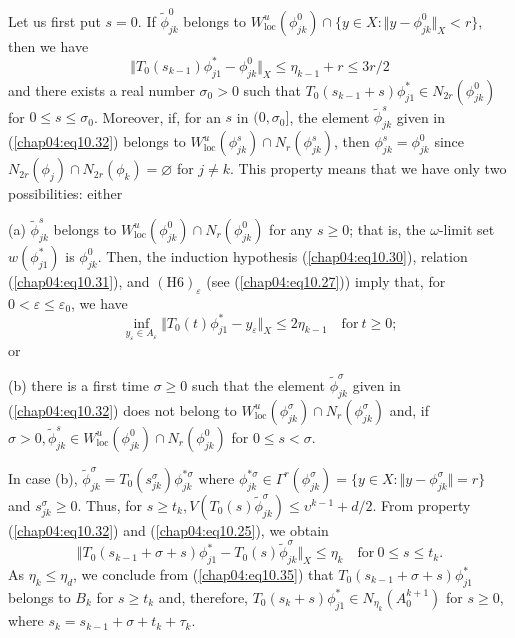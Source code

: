 \documentclass{surv-l}
\theoremstyle{plain}
\theoremstyle{definition}
\numberwithin{equation}{section}
\numberwithin{figure}{chapter}
\begin{document}
Let us first put $s=0$. If $\tilde{\phi}_{jk}^{0}$ belongs to $W_{\mathrm{loc}}^{u}(\phi_{jk}^{0})\cap\{y\in X:\Vert y-\phi_{jk}^{0}\Vert_{X}<r\}$, then we have
\begin{equation}\label{chap04:eq10.33}
\Vert T_{0}(s_{k-1})\phi_{j1}^{\ast}-\phi_{jk}^{0}\Vert_{X}\leq\eta_{k-1}+r\leq 3r/2
\end{equation}
and there exists a real number $\sigma_{0}>0$ such that $T_{0}(s_{k-1}+s)\phi_{j1}^{\ast}\in N_{2r}(\phi_{jk}^{0})$ for $0\leq s\leq\sigma_{0}$. Moreover, if, for an $s$ in $(0,\sigma_{0}]$, the element $\tilde{\phi}_{jk}^{s}$ given in (\ref{chap04:eq10.32}) belongs to $W_{\mathrm{loc}}^{u}(\phi_{jk}^{s})\cap N_{r}(\phi_{jk}^{s})$, then $\phi_{jk}^{s}=\phi_{jk}^{0}$ since $N_{2r}(\phi_{j})\cap N_{2r}(\phi_{k})={\varnothing}$ for $j\neq k$. This property means that we have only two possibilities: either

(a) $\tilde{\phi}_{jk}^{s}$ belongs to $W_{\mathrm{loc}}^{u}(\phi_{jk}^{0})\cap N_{r}(\phi_{jk}^{0})$ for any $s\geq 0$; that is, the $\omega$-limit set $w(\phi_{j1}^{\ast})$ is $\phi_{jk}^{0}$. Then, the induction hypothesis (\ref{chap04:eq10.30}), relation (\ref{chap04:eq10.31}), and $\mathrm{(H6)}_{\varepsilon}$ (see (\ref{chap04:eq10.27})) imply that, for $0<\varepsilon\leq\varepsilon_{0}$, we have
\begin{equation}\label{chap04:eq10.34}
\inf_{y_{\varepsilon}\in A_{\varepsilon}}\Vert T_{0}(t)\phi_{j1}^{\ast}-y_{\varepsilon}\Vert_{X}\leq 2\eta_{k-1}\quad\mathrm{for}\ t\geq 0;
\end{equation}
or

(b) there is a first time $\sigma\geq 0$ such that the element $\tilde{\phi}_{jk}^{\sigma}$ given in (\ref{chap04:eq10.32}) does not belong to $W_{\mathrm{loc}}^{u}(\phi_{jk}^{\sigma})\cap N_{r}(\phi_{jk}^{\sigma})$ and, if $\sigma>0,\tilde{\phi}_{jk}^{s}\in W_{\mathrm{loc}}^{u}(\phi_{jk}^{0})\cap N_{r}(\phi_{jk}^{0})$ for $ 0\leq s<\sigma$.

In case (b), $\tilde{\phi}_{jk}^{\sigma}=T_{0}(s_{jk}^{\sigma})\phi_{jk}^{*\sigma}$ where $\phi_{jk}^{*\sigma}\in\Gamma^{r}(\phi_{jk}^{\sigma})=\{y\in X:\Vert y-\phi_{jk}^{\sigma}\Vert=r\}$ and $s_{jk}^{\sigma}\geq 0$. Thus, for $s \geq t_{k},V(T_{0}(s)\tilde{\phi}_{jk}^{\sigma})\leq \upsilon^{k-1}+d/2$. From property (\ref{chap04:eq10.32}) and (\ref{chap04:eq10.25}), we obtain
\begin{equation}\label{chap04:eq10.35}
\Vert T_{0}(s_{k-1} + \sigma+s)\phi_{j1}^{\ast}- T_{0}(s)\tilde{\phi}_{jk}^{\sigma}\Vert_{X}\leq\eta_{k}\quad \mathrm{for}\ 0\leq s\leq t_{k}.
\end{equation}
As $\eta_{k}\leq\eta_{d}$, we conclude from (\ref{chap04:eq10.35}) that $T_{0}(s_{k-1}+\sigma+s)\phi_{j{1}}^{\ast}$ belongs to $B_{k}$ for $s\geq t_{k}$ and, therefore, $T_{0}(s_{k}+s)\phi_{j1}^{\ast}\in N_{\eta_{k}}(A_{0}^{k+1})$ for $s \geq 0$, where $s_{k}=s_{k-1}+\sigma+t_{k}+\tau_{k}$.
\end{document}

